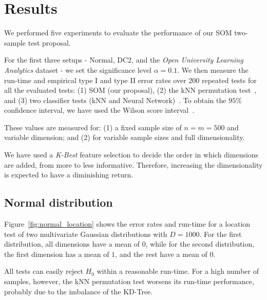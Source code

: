 \section{Results}
\label{sec:som_results}

We performed five experiments to evaluate the performance of our \gls{SOM} 
two-sample test proposal.

For the first three setups - Normal, DC2, and the \emph{Open University Learning Analytics} dataset
- we set the significance level $\alpha = 0.1$. We then measure the run-time and empirical 
type I and type II error rates over $200$ repeated tests for all the evaluated
tests: (1) \gls{SOM}  (our proposal), (2) the \gls{kNN} permutation test~\cite{Schilling1986b},
and (3) two classifier tests (\gls{kNN} and Neural Network)~\cite{lopez2016revisiting}.
To obtain the $95\%$ confidence interval, we have used the Wilson score interval~\cite{Wilson1927}.

These values are measured for: (1) a fixed sample size of $n = m = 500$ and variable dimension;
and (2) for variable sample sizes and full dimensionality.

We have used a \emph{K-Best} feature selection to decide the order in which dimensions are added, from more to less informative.
Therefore, increasing the dimensionality is expected to have a diminishing return.

\subsection{Normal distribution}
Figure~\ref{fig:normal_location} shows the error rates and run-time for a location
test of two multivariate Gaussian distributions with $D=1000$. For the first 
distribution, all dimensions have a mean of $0$, while for the second distribution,
the first dimension has a mean of $1$, and the rest have a mean of $0$.

All tests can easily reject $H_0$ within a reasonable run-time. For
a high number of samples, however, the \gls{kNN} permutation test worsens its run-time performance,
probably due to the imbalance of the KD-Tree.

